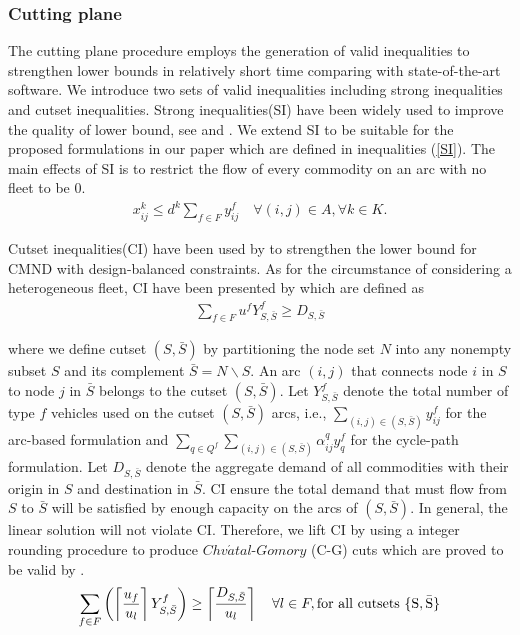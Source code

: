 \documentclass[11pt,nonblindrev,fleqn]{article}
\begin{document}
\subsubsection{Cutting plane}
The cutting plane procedure employs the generation of valid inequalities to strengthen lower bounds in relatively short time comparing with state-of-the-art software. We introduce two sets of valid inequalities including strong inequalities and cutset inequalities. Strong inequalities(SI) have been widely used to improve the quality of lower bound, see \cite{Gendron1994RELAXATIONS,Gendron1999Multicommodity} and \cite{Chouman2015Cutting}. We extend SI to be suitable for the proposed formulations in our paper which are defined in inequalities (\ref{SI}). The main effects of SI is to restrict the flow of every commodity on an arc with no fleet to be 0.
\begin{align}\label{SI}
  x_{ij}^k \leq d^k \sum_{f\in F} y_{ij}^f      \quad       \forall (i,j)\in A, \forall k\in K.
\end{align}

Cutset inequalities(CI) have been used by \cite{Chouman2015Cutting} to strengthen the lower bound for CMND with design-balanced constraints. As for the circumstance of considering a heterogeneous fleet, CI have been presented by \cite{Kim1999Multimodal} which are defined as
\begin{align}
    \sum_{f\in F}u^f Y_{S,\bar{S}}^f \geq  D_{S,\bar{S}}
\end{align}

where we define cutset $(S,\bar{S})$ by partitioning the node set $N$ into any nonempty subset $S$ and its complement $\bar{S}=N\backslash S$. An arc $(i,j)$ that connects node $i$ in $S$ to node $j$ in $\bar{S}$  belongs to the cutset $(S,\bar{S})$. Let $Y_{S,\bar{S}}^f$ denote the total number of type $f$ vehicles used on the cutset $(S,\bar{S})$ arcs, i.e., $\sum_{(i,j)\in (S,\bar{S})} y_{ij}^f$ for the arc-based formulation and $\sum_{q\in Q^f}\sum_{(i,j)\in (S,\bar{S})} \alpha_{ij}^q y_q^f $ for the cycle-path formulation. Let $D_{S,\bar{S}}$ denote the aggregate demand of all commodities with their origin in $S$ and destination in $\bar{S}$. CI ensure the total demand that must flow from $S$ to $\bar{S}$ will be satisfied by enough capacity on the arcs of $(S,\bar{S})$. In general, the linear solution will not violate CI. Therefore, we lift CI by using a integer rounding procedure to produce $Chv\acute{a}tal$-$Gomory$ (C-G) cuts which are proved to be valid by \cite{Kim1999Multimodal}.
\begin{align}
  \sum_{f\in F} \left( \left \lceil \frac{u_f}{u_l} \right \rceil Y_{S,\bar{S}}^f  \right)  \geq \left\lceil \frac{D_{S,\bar{S}}}{u_l} \right\rceil  \quad   \forall l\in F, \rm{for\ all\ cutsets}\ \{S,\bar{S}\}
\end{align}
\end{document}
